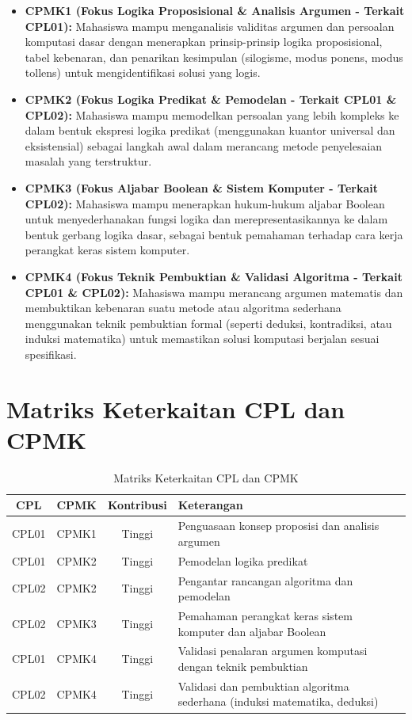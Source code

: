 \begin{itemize}
  \item \textbf{CPMK1 (Fokus Logika Proposisional \& Analisis Argumen - Terkait CPL01):} Mahasiswa mampu menganalisis validitas argumen dan persoalan komputasi dasar dengan menerapkan prinsip-prinsip logika proposisional, tabel kebenaran, dan penarikan kesimpulan (silogisme, modus ponens, modus tollens) untuk mengidentifikasi solusi yang logis.
  
  \item \textbf{CPMK2 (Fokus Logika Predikat \& Pemodelan - Terkait CPL01 \& CPL02):} Mahasiswa mampu memodelkan persoalan yang lebih kompleks ke dalam bentuk ekspresi logika predikat (menggunakan kuantor universal dan eksistensial) sebagai langkah awal dalam merancang metode penyelesaian masalah yang terstruktur.
  
  \item \textbf{CPMK3 (Fokus Aljabar Boolean \& Sistem Komputer - Terkait CPL02):} Mahasiswa mampu menerapkan hukum-hukum aljabar Boolean untuk menyederhanakan fungsi logika dan merepresentasikannya ke dalam bentuk gerbang logika dasar, sebagai bentuk pemahaman terhadap cara kerja perangkat keras sistem komputer.
  
  \item \textbf{CPMK4 (Fokus Teknik Pembuktian \& Validasi Algoritma - Terkait CPL01 \& CPL02):} Mahasiswa mampu merancang argumen matematis dan membuktikan kebenaran suatu metode atau algoritma sederhana menggunakan teknik pembuktian formal (seperti deduksi, kontradiksi, atau induksi matematika) untuk memastikan solusi komputasi berjalan sesuai spesifikasi.
\end{itemize}

\section*{Matriks Keterkaitan CPL dan CPMK}

\begin{table}[htbp]
\centering
\begin{tabular}{|c|c|c|>{\raggedright\arraybackslash}p{5.5cm}|}
  \hline
  \textbf{CPL} & \textbf{CPMK} & \textbf{Kontribusi} & \textbf{Keterangan} \\
  \hline
  CPL01 & CPMK1 & Tinggi & Penguasaan konsep proposisi dan analisis argumen \\
  \hline
  CPL01 & CPMK2 & Tinggi & Pemodelan logika predikat \\
  \hline
  CPL02 & CPMK2 & Tinggi & Pengantar rancangan algoritma dan pemodelan \\
  \hline
  CPL02 & CPMK3 & Tinggi & Pemahaman perangkat keras sistem komputer dan aljabar Boolean \\
  \hline
  CPL01 & CPMK4 & Tinggi & Validasi penalaran argumen komputasi dengan teknik pembuktian \\
  \hline
  CPL02 & CPMK4 & Tinggi & Validasi dan pembuktian algoritma sederhana (induksi matematika, deduksi) \\
  \hline
\end{tabular}
\caption{Matriks Keterkaitan CPL dan CPMK}
\end{table}

